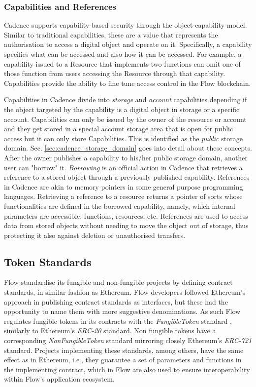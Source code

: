 \documentclass[../NFTComp_IEEE.tex]{subfiles}
\begin{document}
\subsubsection{Capabilities and References}
\label{sec:cadence_capabilities}
Cadence supports capability-based security through the object-capability model. Similar to traditional capabilities, these are a value that represents the authorisation to access a digital object and operate on it. Specifically, a capability specifies what can be accessed and also how it can be accessed. For example, a capability issued to a Resource that implements two functions can omit one of those function from users accessing the Resource through that capability. Capabilities provide the ability to fine tune access control in the Flow blockchain.
\par
Capabilities in Cadence divide into \textit{storage} and \textit{account} capabilities depending if the object targeted by the capability is a digital object in storage or a specific account. Capabilities can only be issued by the owner of the resource or account and they get stored in a special account storage area that is open for public access but it can only store Capabilities. This is identified as the \textit{public} storage domain. Sec. \ref{sec:cadence_storage_domain} goes into detail about these concepts. After the owner publishes a capability to his/her public storage domain, another user can "borrow" it. \textit{Borrowing} is an official action in Cadence that retrieves a reference to a stored object through a previously published capability. References in Cadence are akin to memory pointers in some general purpose programming languages. Retrieving a reference to a resource returns a pointer of sorts whose functionalities are defined in the borrowed capability, namely, which internal parameters are accessible, functions, resources, etc. References are used to access data from stored objects without needing to move the object out of storage, thus protecting it also against deletion or unauthorised transfers.

\subsection{Token Standards}
Flow standardise its fungible and non-fungible projects by defining contract standards, in similar fashion as Ethereum. Flow developers followed Ethereum's approach in publishing contract standards as interfaces, but these had the opportunity to name them with more suggestive denominations. As such Flow regulates fungible tokens in its contracts with the \textit{FungibleToken} standard \cite{Dapper2022c}, similarly to Ethereum's \textit{ERC-20} standard. Non fungible tokens have a corresponding \textit{NonFungibleToken} standard \cite{Dapper2022d} mirroring closely Ethereum's \textit{ERC-721} standard. Projects implementing these standards, among others, have the same effect as in Ethereum, i.e., they guarantee a set of parameters and functions in the implementing contract, which in Flow are also used to ensure interoperability within Flow's application ecosystem.
\end{document}

